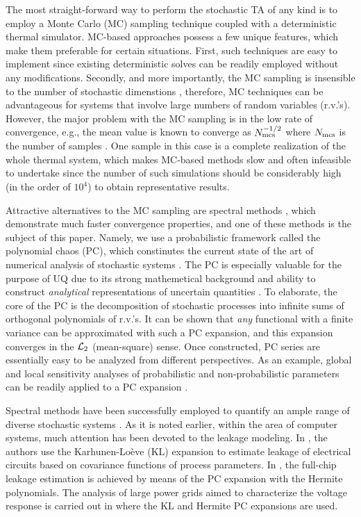 The most straight-forward way to perform the stochastic TA of any kind is to employ a Monte Carlo (MC) sampling technique coupled with a deterministic thermal simulator. MC-based approaches possess a few unique features, which make them preferable for certain situations. First, such techniques are easy to implement since existing deterministic solves can be readily employed without any modifications. Secondly, and more importantly, the MC sampling is insensible to the number of stochastic dimenstions \cite{maitre2010}, therefore, MC techniques can be advantageous for systems that involve large numbers of random variables (r.v.'s). However, the major problem with the MC sampling is in the low rate of convergence, e.g., the mean value is known to converge as $N_\text{mcs}^{-{{1}/{2}}}$ where $N_\text{mcs}$ is the number of samples \cite{xiu2009, maitre2010}. One sample in this case is a complete realization of the whole thermal system, which makes MC-based methods slow and often infeasible to undertake since the number of such simulations should be considerably high (in the order of $10^4$) to obtain representative results.

Attractive alternatives to the MC sampling are spectral methods \cite{maitre2010}, which demonstrate much faster convergence properties, and one of these methods is the subject of this paper. Namely, we use a probabilistic framework called the polynomial chaos (PC), which constinutes the current state of the art of numerical analysis of stochastic systems \cite{xiu2009}. The PC is especially valuable for the purpose of UQ due to its strong mathemetical background and ability to construct \emph{analytical} representations of uncertain quantities \cite{eldred2009}. To elaborate, the core of the PC is the decomposition of stochastic processes into infinite sums of orthogonal polynomials of r.v.'s. It can be shown that \emph{any} functional with a finite variance can be approximated with such a PC expansion, and this expansion converges in the $\mathcal{L}_{2}$ (mean-square) sense. Once constructed, PC series are essentially easy to be analyzed from different perspectives. As an example, global and local sensitivity analyses of probabilistic and non-probabilistic parameters can be readily applied to a PC expansion \cite{eldred2009, maitre2010}.

Spectral methods have been successfully employed to quantify an ample range of diverse stochastic systems \cite{xiu2010}. As it is noted earlier, within the area of computer systems, much attention has been devoted to the leakage modeling. In \cite{bhardwaj2006}, the authors use the Karhunen-Lo\`{e}ve (KL) expansion \cite{loeve1978} to estimate leakage of electrical circuits based on covariance functions of process parameters. In \cite{shen2009}, the full-chip leakage estimation is achieved by means of the PC expansion with the Hermite polynomials. The analysis of large power grids aimed to characterize the voltage response is carried out in \cite{ghanta2006} where the KL and Hermite PC expansions are used.

